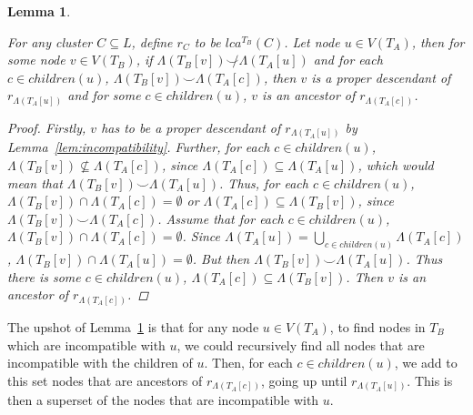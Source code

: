 \documentclass{article}
\newcommand{\compatible}{\smile}
\newcommand{\leafset}{\Lambda}
\newtheorem{filterclustersfindingincompatible}[incompatibility]{Lemma}
\begin{document}
    \begin{filterclustersfindingincompatible}
        \label{lem:filterclustersfindingincompatible}

        For any cluster $C \subseteq L$, define $r_C$ to be $lca^{T_B}(C)$. Let node $u \in V(T_A)$, then for some node $v \in V(T_B)$, if $\leafset(T_B[v]) \not\compatible \leafset(T_A[u])$ and for each $c \in children(u)$, $\leafset(T_B[v]) \compatible \leafset(T_A[c])$, then $v$ is a proper descendant of $r_{\leafset(T_A[u])}$ and for some $c \in children(u)$, $v$ is an ancestor of $r_{\leafset(T_A[c])}$.

        \begin{proof}
            Firstly, $v$ has to be a proper descendant of $r_{\leafset(T_A[u])}$ by Lemma~\ref{lem:incompatibility}. Further, for each $c \in children(u)$, $\leafset(T_B[v]) \not\subseteq \leafset(T_A[c])$, since $\leafset(T_A[c]) \subseteq \leafset(T_A[u])$, which would mean that $\leafset(T_B[v]) \compatible \leafset(T_A[u])$. Thus, for each $c \in children(u)$, $\leafset(T_B[v]) \cap \leafset(T_A[c]) = \emptyset$ or $\leafset(T_A[c]) \subseteq \leafset(T_B[v])$, since $\leafset(T_B[v]) \compatible \leafset(T_A[c])$. Assume that for each $c \in children(u)$, $\leafset(T_B[v]) \cap \leafset(T_A[c]) = \emptyset$. Since $\leafset(T_A[u]) = \bigcup_{c \in children(u)} \leafset(T_A[c])$, $\leafset(T_B[v]) \cap \leafset(T_A[u]) = \emptyset$. But then $\leafset(T_B[v]) \compatible \leafset(T_A[u])$. Thus there is some $c \in children(u)$, $\leafset(T_A[c]) \subseteq \leafset(T_B[v])$. Then $v$ is an ancestor of $r_{\leafset(T_A[c])}$.
        \end{proof}
    \end{filterclustersfindingincompatible}

    The upshot of Lemma~\ref{lem:filterclustersfindingincompatible} is that for any node $u \in V(T_A)$, to find nodes in $T_B$ which are incompatible with $u$, we could recursively find all nodes that are incompatible with the children of $u$. Then, for each $c \in children(u)$, we add to this set nodes that are ancestors of $r_{\leafset(T_A[c])}$, going up until $r_{\leafset(T_A[u])}$. This is then a superset of the nodes that are incompatible with $u$.
\end{document}
